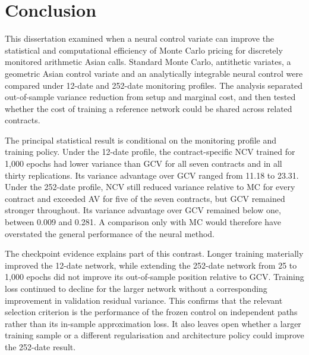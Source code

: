 \chapter{Conclusion}
\label{chap:conclusion}

This dissertation examined when a neural control variate can improve the statistical and computational efficiency of Monte Carlo pricing for discretely monitored arithmetic Asian calls. Standard Monte Carlo, antithetic variates, a geometric Asian control variate and an analytically integrable neural control were compared under 12-date and 252-date monitoring profiles. The analysis separated out-of-sample variance reduction from setup and marginal cost, and then tested whether the cost of training a reference network could be shared across related contracts.

The principal statistical result is conditional on the monitoring profile and training policy. Under the 12-date profile, the contract-specific NCV trained for 1{,}000 epochs had lower variance than GCV for all seven contracts and in all thirty replications. Its variance advantage over GCV ranged from 11.18 to 23.31. Under the 252-date profile, NCV still reduced variance relative to MC for every contract and exceeded AV for five of the seven contracts, but GCV remained stronger throughout. Its variance advantage over GCV remained below one, between 0.009 and 0.281. A comparison only with MC would therefore have overstated the general performance of the neural method.

The checkpoint evidence explains part of this contrast. Longer training materially improved the 12-date network, while extending the 252-date network from 25 to 1{,}000 epochs did not improve its out-of-sample position relative to GCV. Training loss continued to decline for the larger network without a corresponding improvement in validation residual variance. This confirms that the relevant selection criterion is the performance of the frozen control on independent paths rather than its in-sample approximation loss. It also leaves open whether a larger training sample or a different regularisation and architecture policy could improve the 252-date result.

